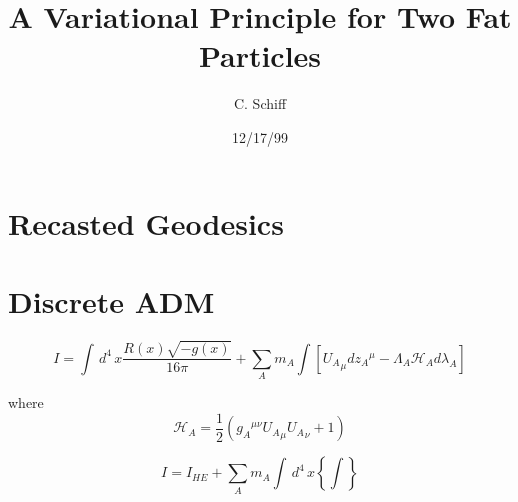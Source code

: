 %
% 
%
%
%                

%
%

\def\.{{\quad .}}
\def\_.{{\quad .}}
\def\_,{{\quad ,}}

%
%

\draft



%
%
\title{A Variational Principle for Two Fat Particles}
%
\author{C. Schiff}
\address{
            Department of Physics, University of Maryland,
            College Park MD 20742-4111 USA\\
           \rm
         e-mail: \tt  cmschiff@erols.com\\
					  Revision 1.0
}
\date{12/17/99}
\maketitle


%
%
\begin{abstract}
\end{abstract}

\section{Recasted Geodesics}



\section{Discrete ADM}

\begin{equation}
  I =   \int \, d^4 \, x \frac{R(x)\sqrt{-g(x)}}{16 \pi} 
     +  \sum _{A} m_A \int \left[ {U_A}_{\mu} d {z_A}^{\mu} 
	 - \Lambda _{A} {\mathcal H}_A d \lambda _A \right]
\end{equation}

where
\[
{\mathcal H}_A = \frac{1}{2} \left( {g_A}^{\mu\nu} {U_A}_{\mu} {U_A}_{\nu} + 1 \right)
\]

\begin{equation}
I = I_{HE} + \sum _{A} m_A \int \, d^4 \, x 
             \left\{
			   \int 
			 \right\}
\end{equation}




